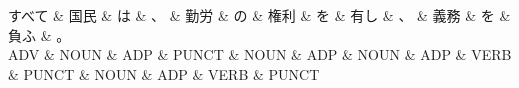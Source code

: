 \documentclass[tikz,border=5pt]{standalone}
\begin{document}
\normalsize
\begin{dependency}[edge unit distance=12.0pt]
    \begin{deptext}[column sep=1em]
        すべて \& 国民 \& は \& 、 \& 勤労 \& の \& 権利 \& を \& 有し \& 、 \& 義務 \& を \& 負ふ \& 。\\
        ADV \& NOUN \& ADP \& PUNCT \& NOUN \& ADP \& NOUN \& ADP \& VERB \& PUNCT \& NOUN \& ADP \& VERB \& PUNCT\\
    \end{deptext}
\end{dependency}
\end{document}
